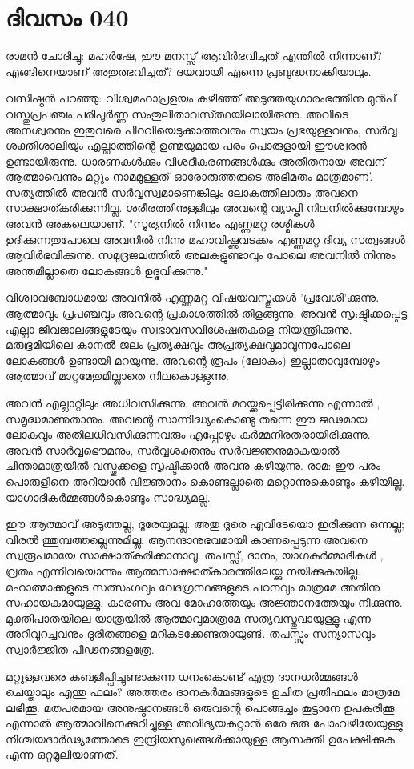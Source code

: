 \newpage
\section{ദിവസം 040}


രാമന്‍ ചോദിച്ചു: മഹര്‍ഷേ, ഈ മനസ്സ്‌ ആവിര്‍ഭവിച്ചത്‌ എന്തില്‍ നിന്നാണ്‌? എങ്ങിനെയാണ്‌ അതുത്ഭവിച്ചത്‌? ദയവായി എന്നെ പ്രബുദ്ധനാക്കിയാലും.

വസിഷ്ഠന്‍ പറഞ്ഞു: വിശ്വമഹാപ്രളയം കഴിഞ്ഞ്‌ അടുത്തയുഗാരംഭത്തിനു മുന്‍പ്‌ വസ്തുപ്രപഞ്ചം പരിപൂര്‍ണ്ണ സംതുലിതാവസ്ത്ഥയിലായിരുന്നു. അവിടെ അനശ്വരനും ഇതുവരെ പിറവിയെടുക്കാത്തവനും സ്വയം പ്രഭയുള്ളവനും, സര്‍വ്വ ശക്തിശാലിയും എല്ലാത്തിന്റെ ഉണ്മയുമായ പരം പൊരുളായി ഈശ്വരന്‍ ഉണ്ടായിരുന്നു. ധാരണകള്‍ക്കും വിശദീകരണങ്ങള്‍ക്കും അതീതനായ അവന്‌ ആത്മാവെന്നും മറ്റും നാമമുള്ളത്‌ ഓരോരുത്തരുടെ അഭിമതം മാത്രമാണ്‌. സത്യത്തില്‍ അവന്‍ സര്‍വ്വസ്വമാണെങ്കിലും ലോകത്തിലാരും അവനെ സാക്ഷാത്കരിക്കുന്നില്ല. ശരീരത്തിനുള്ളിലും അവന്റെ വ്യാപ്തി നിലനില്‍ക്കുമ്പോഴും അവന്‍ അകലെയാണ്‌. "സൂര്യനില്‍ നിന്നും എണ്ണമറ്റ രശ്മികള്‍ ഉദിക്കുന്നതുപോലെ അവനില്‍ നിന്നു മഹാവിഷ്ണുവടക്കം എണ്ണമറ്റ ദിവ്യ സത്വങ്ങള്‍ ആവിര്‍ഭവിക്കുന്നു. സമുദ്രജലത്തില്‍ അലകളുണ്ടാവും പോലെ അവനില്‍ നിന്നും അന്തമില്ലാതെ ലോകങ്ങള്‍ ഉദ്ഭവിക്കുന്നു."

വിശ്വാവബോധമായ അവനില്‍ എണ്ണമറ്റ വിഷയവസ്തുക്കള്‍ 'പ്രവേശി'ക്കുന്നു. ആത്മാവും പ്രപഞ്ചവും അവന്റെ പ്രകാശത്തില്‍ തിളങ്ങുന്നു. അവന്‍ സൃഷ്ടിക്കപ്പെട്ട എല്ലാ ജീവജാലങ്ങളുടേയും സ്വഭാവസവിശേഷതകളെ നിയന്ത്രിക്കുന്നു. മരുഭൂമിയിലെ കാനല്‍ ജലം പ്രത്യക്ഷവും അപ്രത്യക്ഷവുമാവുന്നപോലെ ലോകങ്ങള്‍ ഉണ്ടായി മറയുന്നു. അവന്റെ രൂപം (ലോകം) ഇല്ലാതാവുമ്പോഴും ആത്മാവ്‌ മാറ്റമേതുമില്ലാതെ നിലകൊള്ളുന്നു. 

അവന്‍ എല്ലാറ്റിലും അധിവസിക്കുന്നു. അവന്‍ മറയ്ക്കപ്പെട്ടിരിക്കുന്നു എന്നാല്‍ , സമൃദ്ധമാണുതാനും. അവന്റെ സാന്നിദ്ധ്യംകൊണ്ടു തന്നെ ഈ ജഢമായ ലോകവും അതിലധിവസിക്കുന്നവരും എപ്പോഴും കര്‍മ്മനിരതരായിരിക്കുന്നു. അവന്‍ സാര്‍വ്വഭൌമനും, സര്‍വ്വശക്തനും സര്‍വജ്ഞനുമാകയാല്‍ ചിന്താമാത്രയില്‍ വസ്തുക്കളെ സൃഷ്ടിക്കാന്‍ അവനു കഴിയുന്നു. രാമ: ഈ പരം പൊരുളിനെ അറിയാന്‍ വിജ്ഞാനം കൊണ്ടല്ലാതെ മറ്റൊന്നുകൊണ്ടും കഴിയില്ല. യാഗാദികര്‍മ്മങ്ങള്‍കൊണ്ടും സാദ്ധ്യമല്ല.

ഈ  ആത്മാവ്‌  അടുത്തല്ല, ദൂരേയുമല്ല. അതു ദൂരെ എവിടേയൊ ഇരിക്കുന്ന ഒന്നല്ല; വിരല്‍ ത്തുമ്പത്തല്ലെന്നുമില്ല. ആനന്ദാനുഭവമായി കാണപ്പെടുന്ന അവനെ സ്വരൂപമായേ സാക്ഷാത്കരിക്കാനാവൂ. തപസ്സ്‌, ദാനം, യാഗകര്‍മ്മാദികള്‍ , വ്രതം എന്നിവയൊന്നും ആത്മസാക്ഷാത്കാരത്തിലേയ്ക്കു നയിക്കുകയില്ല. മഹാത്മാക്കളുടെ സത്സംഗവും വേദഗ്രന്ഥങ്ങളുടെ പഠനവും മാത്രമേ അതിനു സഹായകമായുള്ളു. കാരണം അവ മോഹത്തേയും അജ്ഞാനത്തേയും നീക്കുന്നു. മുക്തിപാതയിലെ യാത്രയില്‍ ആത്മാവുമാത്രമേ സത്യവസ്തുവായുള്ളൂ എന്ന അറിവുറച്ചവനും ദുരിതങ്ങളെ മറികടക്കേണ്ടതായുണ്ട്‌. തപസ്സും സന്യാസവും സ്വാര്‍ജ്ജിത പീഢനങ്ങളത്രേ.

മറ്റുള്ളവരെ കബളിപ്പിച്ചുണ്ടാക്കുന്ന ധനംകൊണ്ട്‌ എത്ര ദാനധര്‍മ്മങ്ങള്‍ ചെയ്താലും എന്തു ഫലം? അത്തരം ദാനകര്‍മ്മങ്ങളുടെ ഉചിത  പ്രതിഫലം മാത്രമേ ലഭിക്കൂ. മതപരമായ അനുഷ്ഠാനങ്ങള്‍ ഒരുവന്റെ പൊങ്ങച്ചം കൂട്ടാനേ ഉപകരിക്കൂ. എന്നാല്‍  ആത്മാവിനെക്കുറിച്ചുള്ള അവിദ്യയകറ്റാന്‍ ഒരേ ഒരു പോംവഴിയേയുള്ളു. നിശ്ചയദാര്‍ഢ്യത്തോടെ ഇന്ദ്രിയസുഖങ്ങള്‍ക്കായുള്ള ആസക്തി ഉപേക്ഷിക്കുക എന്ന ഒറ്റമൂലിയാണത്‌.
